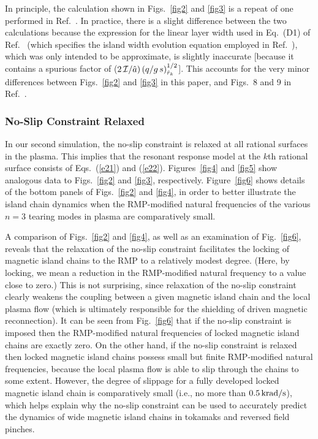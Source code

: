 \documentclass[12pt,prb,aps]{revtex4-1}
\begin{document}
In principle, the calculation shown in Figs.~\ref{fig2} and \ref{fig3} is a repeat of one performed in Ref.~. In practice, there is a slight difference between
the two calculations because the expression for the linear layer width used in Eq.~(D1) of Ref.~ (which specifies the island width evolution
equation employed in Ref.~), which was only intended to be approximate,  is slightly inaccurate [because it contains a spurious factor of ($2\,{\cal I}/\hat{a})\,(q/g\,s)^{1/2}_{\hat{r}_k}$]. This accounts for the very minor differences between Figs.~\ref{fig2} and \ref{fig3} in this
paper, and Figs.~8 and 9 in Ref.~. 

\subsubsection{No-Slip Constraint Relaxed}
In our second simulation, the no-slip constraint is relaxed at all rational surfaces in the plasma. This implies that the resonant response
model at the $k$th rational surface consists of Eqs.~(\ref{e21}) and (\ref{e22}). Figures~\ref{fig4} and \ref{fig5} show analogous 
data to Figs.~\ref{fig2} and \ref{fig3}, respectively. Figure~\ref{fig6} shows details of the bottom panels of Figs.~\ref{fig2} and \ref{fig4},
in order to better illustrate the island chain dynamics when the  RMP-modified natural frequencies of the various $n=3$ tearing modes in  plasma
are comparatively small. 

A comparison of Figs.~\ref{fig2} and \ref{fig4}, as well as an examination of Fig.~\ref{fig6}, reveals that the relaxation of the
no-slip constraint facilitates the locking of magnetic island chains to the RMP to a relatively modest degree. (Here, by locking, we mean a reduction in the
RMP-modified natural frequency to a value close to zero.) 
This is not surprising, since
relaxation of the no-slip constraint clearly weakens the coupling between a given magnetic island chain and the local plasma flow (which is ultimately responsible
for the shielding of driven magnetic reconnection). 
It can be seen from Fig.~\ref{fig6} that if the no-slip constraint is imposed then the RMP-modified natural frequencies of locked magnetic
island chains are exactly zero. On the other hand, if the no-slip constraint is relaxed then locked magnetic island chains possess
 small but finite RMP-modified natural frequencies, because the local plasma flow is able to slip through the  chains to some
 extent. However, the degree of slippage for a fully developed locked magnetic island chain is comparatively small (i.e., no more than
 $0.5\,{\rm krad/s}$), which helps explain
 why the no-slip constraint can be used to accurately predict the dynamics of wide magnetic island chains in tokamaks and reversed field pinches.\cite{rfp} 
\end{document}
